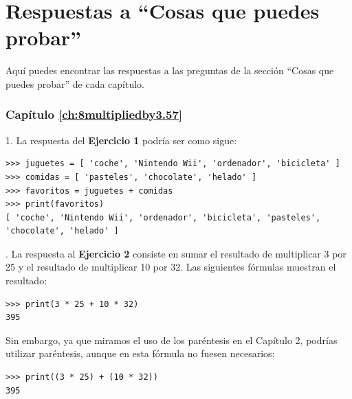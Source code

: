 

\chapter{Respuestas a ``Cosas que puedes probar''}\label{app:answers}

Aquí puedes encontrar las respuestas a las preguntas de la sección ``Cosas que puedes probar'' de cada capítulo.

\subsection*{Capítulo \ref{ch:8multipliedby3.57}}

1. La respuesta del \textbf{Ejercicio 1} podría ser como sigue:

\begin{listing}
\begin{verbatim}
>>> juguetes = [ 'coche', 'Nintendo Wii', 'ordenador', 'bicicleta' ]
>>> comidas = [ 'pasteles', 'chocolate', 'helado' ]
>>> favoritos = juguetes + comidas
>>> print(favoritos)
[ 'coche', 'Nintendo Wii', 'ordenador', 'bicicleta', 'pasteles', 'chocolate', 'helado' ]
\end{verbatim}
\end{listing}

.  La respuesta al \textbf{Ejercicio 2} consiste en sumar el resultado de multiplicar 3 por 25 y el resultado de multiplicar 10 por 32.   Las siguientes fórmulas muestran el resultado:

\begin{listing}
\begin{verbatim}
>>> print(3 * 25 + 10 * 32)
395
\end{verbatim}
\end{listing}

\noindent
Sin embargo, ya que miramos el uso de los paréntesis en el Capítulo 2, podrías utilizar paréntesis, aunque en esta fórmula no fuesen necesarios:

\begin{listing}
\begin{verbatim}
>>> print((3 * 25) + (10 * 32))
395
\end{verbatim}
\end{listing}


